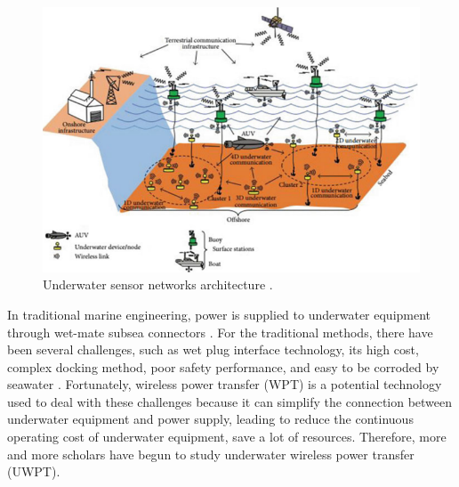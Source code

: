 \begin{figure}[htbp]
    \centering
    \includegraphics[width=0.7\linewidth]{images/1_underwater_sensor_networks.png}
    \caption{Underwater sensor networks architecture \cite{Nayyar}.}
    \label{fig:underwater sensor networks}
\end{figure}

In traditional marine engineering, power is supplied to underwater equipment through wet-mate subsea connectors \cite{Painter2006}.
For the traditional methods, there have been several challenges, such as wet plug interface technology, its high cost, complex docking method, poor safety performance, and easy to be corroded by seawater \cite{Painter2006, Tianlei_Wang_2016}.
Fortunately, wireless power transfer (WPT) is a potential technology used to deal with these challenges because it can simplify the connection between underwater equipment and power supply, leading to reduce the continuous operating cost of underwater equipment, save a lot of resources.
Therefore, more and more scholars have begun to study underwater wireless power transfer (UWPT).\cite{Song, Orekan, Yang2019, Hasaba2019, Orekan2018}

